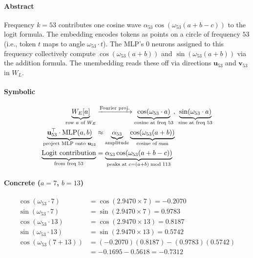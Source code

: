 \documentclass[11pt,a4paper]{article}
\begin{document}
\paragraph{Abstract}
Frequency $k = 53$ contributes one cosine wave $\alpha_{53} \cos(\omega_{53}(a+b-c))$ to the logit formula. The embedding encodes tokens as points on a circle of frequency $53$ (i.e., token $t$ maps to angle $\omega_{53} \cdot t$). The MLP's 0 neurons assigned to this frequency collectively compute $\cos(\omega_{53}(a+b))$ and $\sin(\omega_{53}(a+b))$ via the addition formula. The unembedding reads these off via directions $\mathbf{u}_{53}$ and $\mathbf{v}_{53}$ in $W_L$.

\paragraph{Symbolic}
\begin{align}
    \underbrace{W_E[a]}_{\text{row } a \text{ of } W_E} &\xrightarrow{\text{Fourier proj.}} \underbrace{\cos\!\left(\omega_{53} \cdot a\right)}_{\text{cosine at freq } 53},\;\underbrace{\sin\!\left(\omega_{53} \cdot a\right)}_{\text{sine at freq } 53}    \notag \\
    \underbrace{\mathbf{u}_{53}^\top \cdot \text{MLP}(a,b)}_{\text{project MLP onto } \mathbf{u}_{53}} &\approx \underbrace{\alpha_{53}}_{\text{amplitude}} \underbrace{\cos(\omega_{53}(a+b))}_{\text{cosine of sum}}    \notag \\
    \underbrace{\text{Logit contribution}}_{\text{from freq } 53} &= \underbrace{\alpha_{53} \cos(\omega_{53}(a+b-c))}_{\text{peaks at } c = (a+b) \bmod 113}    \notag
\end{align}

\paragraph{Concrete ($a = 7$, $b = 13$)}

\begin{align*}
    \cos(\omega_{53} \cdot 7) &= \cos(2.9470 \times 7) = -0.2070 \\
    \sin(\omega_{53} \cdot 7) &= \sin(2.9470 \times 7) = 0.9783 \\
    \cos(\omega_{53} \cdot 13) &= \cos(2.9470 \times 13) = 0.8187 \\
    \sin(\omega_{53} \cdot 13) &= \sin(2.9470 \times 13) = 0.5742 \\
    \cos(\omega_{53}(7+13)) &= (-0.2070)(0.8187) - (0.9783)(0.5742) \\
    &= -0.1695 - 0.5618 = -0.7312 \\
\end{align*}
\end{document}

